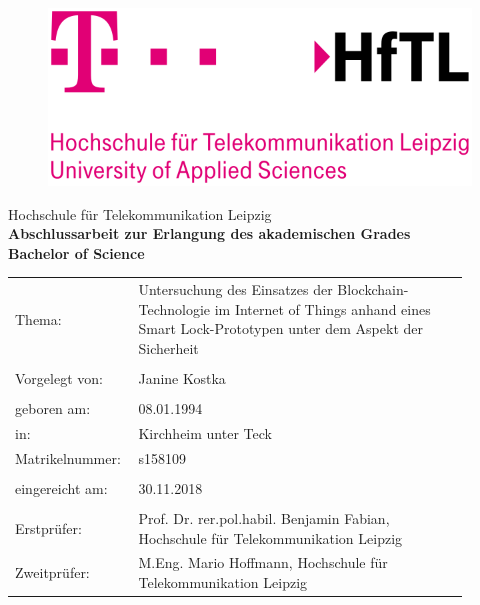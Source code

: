 \documentclass[toc=sectionentrywithdots,a4paper,12pt,oneside]{scrartcl}
\newcommand{\grad}{Bachelor of Science}
\newcommand{\matrinr}{s158109}
\newcommand{\thema}{Untersuchung des Einsatzes der Blockchain-Technologie im Internet of Things anhand eines Smart Lock-Prototypen unter dem Aspekt der Sicherheit}
\newcommand{\name}{Janine Kostka}
\newcommand{\geb}{08.01.1994}
\newcommand{\ort}{Kirchheim unter Teck}
\newcommand{\erstp}{Prof. Dr. rer.pol.habil. Benjamin Fabian}
\newcommand{\instituterst}{Hochschule für Telekommunikation Leipzig}
\newcommand{\zweitp}{M.Eng. Mario Hoffmann}
\newcommand{\institutzweit}{Hochschule für Telekommunikation Leipzig}
\newcommand{\abgabe}{30.11.2018}
\begin{document}
	\begin{titlepage}
    \begin{spacing}{1.0}
		\begin{figure}[h]
			\includegraphics[scale=0.2]{hftl_logo.png}
		\end{figure}
		\vspace*{20pt}
		\centering
		Hochschule für Telekommunikation Leipzig\\
		\vspace*{40pt}
		\large \textbf{Abschlussarbeit zur Erlangung des akademischen Grades}\\
		\doublespacing
		\textbf{\grad} %
		\vspace*{100pt}
		\begin{table}[h!]
			\begin{tabular}{p{0.2\linewidth}p{0.7\linewidth}}
				Thema: & \large \thema \\
				\\[5em]
				Vorgelegt von: & \large \name  \\
				\\[2em]
				geboren am: & \geb \\
				in: & \ort \\
				Matrikelnummer: & \matrinr \\
			 	\\[2em]
			 	eingereicht am: & \abgabe \\
			 	\\[2em]
			 	Erstprüfer: & \erstp, \instituterst \\
			 	Zweitprüfer: & \zweitp, \institutzweit \\
			\end{tabular}
		\end{table}
	\normalsize
	\end{spacing}
	\end{titlepage}
\end{document}
